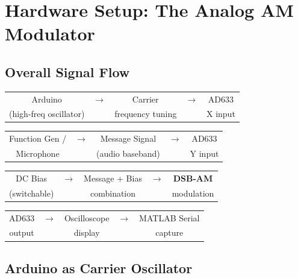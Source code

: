\documentclass[11pt,letterpaper]{article}
\begin{document}
\section{Hardware Setup: The Analog AM Modulator}

\subsection{Overall Signal Flow}

\vspace{0.2in}
\noindent
\begin{tabular}{ccccc}
Arduino & $\to$ & Carrier & $\to$ & AD633 \\
(high-freq oscillator) &  & frequency tuning &  & X input \\
\end{tabular}

\vspace{0.3in}

\noindent
\begin{tabular}{ccccc}
Function Gen / & $\to$ & Message Signal & $\to$ & AD633 \\
Microphone & & (audio baseband) & & Y input \\
\end{tabular}

\vspace{0.3in}

\noindent
\begin{tabular}{ccccc}
DC Bias & $\to$ & Message + Bias & $\to$ & \textbf{DSB-AM} \\
(switchable) & & combination & & modulation \\
\end{tabular}

\vspace{0.3in}

\noindent
\begin{tabular}{ccccc}
AD633 & $\to$ & Oscilloscope & $\to$ & MATLAB Serial \\
output &  & display & & capture \\
\end{tabular}

\vspace{0.2in}

\subsection{Arduino as Carrier Oscillator}
\end{document}
